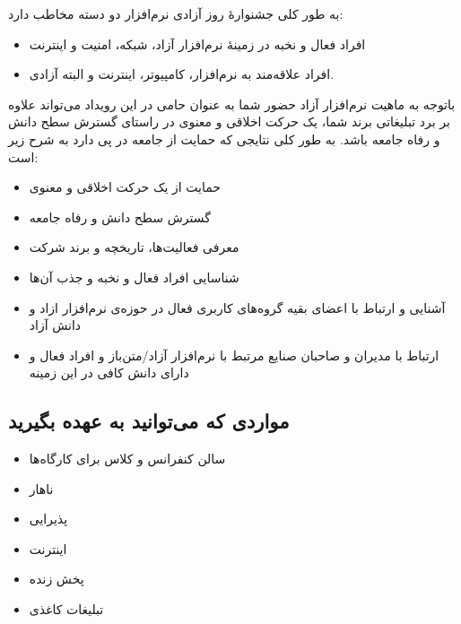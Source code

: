 \documentclass{article}
\begin{document}
\begin{flushright}

به طور کلی جشنوارهٔ روز‌ آزادی نرم‌افزار دو دسته مخاطب دارد:
\begin{itemize}
\item افراد فعال و نخبه در زمینهٔ نرم‌افزار آزاد، شبکه، امنیت و اینترنت
\item افراد علاقه‌مند به نرم‌افزار، کامپیوتر، اینترنت و البته آزادی.
\end{itemize}

\end{flushright}
\begin{flushright}

باتوجه به ماهیت نرم‌افزار آزاد حضور شما به عنوان حامی در این رویداد می‌تواند علاوه‌ بر برد تبلیغاتی برند شما، یک حرکت اخلاقی و معنوی در راستای گسترش سطح دانش و رفاه جامعه باشد. به طور کلی نتایجی که حمایت از جامعه در پی دارد به شرح زیر است:
\begin{itemize}
\item حمایت از یک حرکت اخلاقی و معنوی
\item گسترش سطح دانش و رفاه جامعه
\item معرفی فعالیت‌ها، تاریخچه و برند شرکت
\item شناسایی افراد فعال و نخبه و جذب آن‌ها
\item آشنایی و ارتباط با اعضای بقیه گروه‌های کاربری فعال در حوزه‌ی نرم‌افزار ازاد و دانش آزاد
\item ارتباط با مدیران و صاحبان صنایع مرتبط با نرم‌افزار آزاد/متن‌باز و افراد فعال و دارای دانش کافی در این زمینه
\end{itemize}

\end{flushright}

\subsection{مواردی که می‌توانید به عهده بگیرید}


\begin{flushright}

\begin{itemize}
\item سالن کنفرانس و کلاس برای کارگاه‌ها
\item ناهار
\item پذیرایی
\item اینترنت
\item پخش زنده
\item تبلیغات کاغذی
\end{itemize}

\end{flushright}
\end{document}
